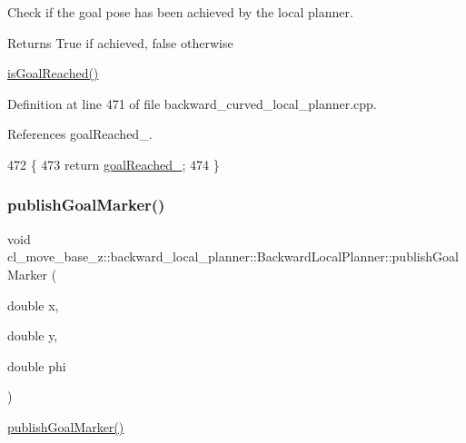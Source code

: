 Check if the goal pose has been achieved by the local planner. 

\begin{DoxyReturn}{Returns}
True if achieved, false otherwise
\end{DoxyReturn}
\hyperlink{classcl__move__base__z_1_1backward__local__planner_1_1BackwardLocalPlanner_a06a99e609ed31b97f765351dd6827722}{is\+Goal\+Reached()} 

Definition at line 471 of file backward\+\_\+curved\+\_\+local\+\_\+planner.\+cpp.



References goal\+Reached\+\_\+.


\begin{DoxyCode}
472         \{
473             \textcolor{keywordflow}{return} \hyperlink{classcl__move__base__z_1_1backward__local__planner_1_1BackwardLocalPlanner_ad443c52ef585a8eab0364f0909222f51}{goalReached\_};
474         \}
\end{DoxyCode}
\mbox{\label{classcl__move__base__z_1_1backward__local__planner_1_1BackwardLocalPlanner_a70eaeb6cf31fd3378d9fbf9bcb975995}} 
\subsubsection{\texorpdfstring{publish\+Goal\+Marker()}{publishGoalMarker()}}
{\footnotesize\ttfamily void cl\+\_\+move\+\_\+base\+\_\+z\+::backward\+\_\+local\+\_\+planner\+::\+Backward\+Local\+Planner\+::publish\+Goal\+Marker (\begin{DoxyParamCaption}\item[{double}]{x,  }\item[{double}]{y,  }\item[{double}]{phi }\end{DoxyParamCaption})\hspace{0.3cm}{\ttfamily [private]}}

\hyperlink{classcl__move__base__z_1_1backward__local__planner_1_1BackwardLocalPlanner_a70eaeb6cf31fd3378d9fbf9bcb975995}{publish\+Goal\+Marker()} 

